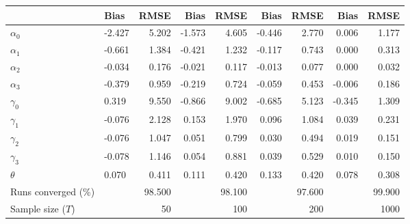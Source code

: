 
\begin{tabular}[t]{llrrrrrrr}
\toprule
  & Bias & RMSE & Bias & RMSE & Bias & RMSE & Bias & RMSE\\
\midrule
$\alpha_{0}$ & -2.427 & 5.202 & -1.573 & 4.605 & -0.446 & 2.770 & 0.006 & 1.177\\
$\alpha_{1}$ & -0.661 & 1.384 & -0.421 & 1.232 & -0.117 & 0.743 & 0.000 & 0.313\\
$\alpha_{2}$ & -0.034 & 0.176 & -0.021 & 0.117 & -0.013 & 0.077 & 0.000 & 0.032\\
$\alpha_{3}$ & -0.379 & 0.959 & -0.219 & 0.724 & -0.059 & 0.453 & -0.006 & 0.186\\
$\gamma_{0}$ & 0.319 & 9.550 & -0.866 & 9.002 & -0.685 & 5.123 & -0.345 & 1.309\\
$\gamma_{1}$ & -0.076 & 2.128 & 0.153 & 1.970 & 0.096 & 1.084 & 0.039 & 0.231\\
$\gamma_{2}$ & -0.076 & 1.047 & 0.051 & 0.799 & 0.030 & 0.494 & 0.019 & 0.151\\
$\gamma_{3}$ & -0.078 & 1.146 & 0.054 & 0.881 & 0.039 & 0.529 & 0.010 & 0.150\\
$\theta$ & 0.070 & 0.411 & 0.111 & 0.420 & 0.133 & 0.420 & 0.078 & 0.308\\
Runs converged (\%) &  & 98.500 &  & 98.100 &  & 97.600 &  & 99.900\\
Sample size ($T$) &  & 50 &  & 100 &  & 200 &  & 1000\\
\bottomrule
\end{tabular}
